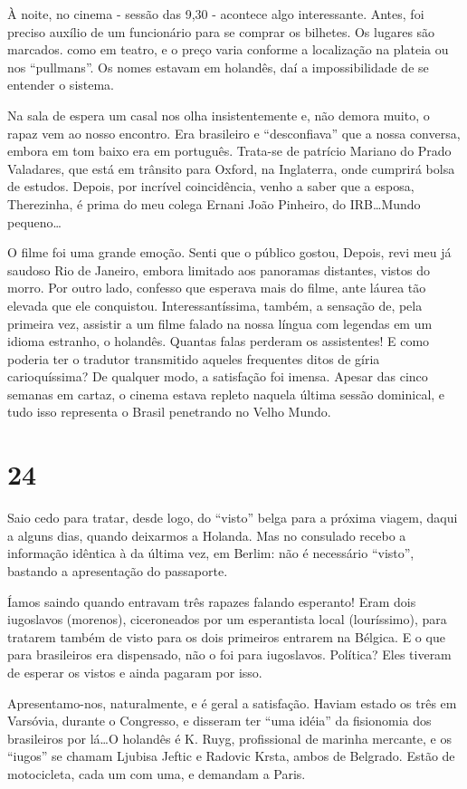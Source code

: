 À noite, no cinema - sessão das 9,30 - acontece algo interessante. Antes, foi preciso auxílio de um funcionário para se comprar os bilhetes. Os lugares são marcados. como em teatro, e o preço varia conforme a localização na plateia ou nos “pullmans”. Os nomes estavam em holandês, daí a impossibilidade de se entender o sistema.

Na sala de espera um casal nos olha insistentemente e, não demora muito, o rapaz vem ao nosso encontro. Era brasileiro e “desconfiava” que a nossa conversa, embora em tom baixo era em português. Trata-se de patrício Mariano do Prado Valadares, que está em trânsito para Oxford, na Inglaterra, onde cumprirá bolsa de estudos. Depois, por incrível coincidência, venho a saber que a esposa, Therezinha, é prima do meu colega Ernani João Pinheiro, do IRB\ldots Mundo pequeno\ldots

O filme foi uma grande emoção. Senti que o público gostou, Depois, revi meu já saudoso Rio de Janeiro, embora limitado aos panoramas distantes, vistos do morro. Por outro lado, confesso que esperava mais do filme, ante láurea tão elevada que ele conquistou. Interessantíssima, também, a sensação de, pela primeira vez, assistir a um filme falado na nossa língua com legendas em um idioma estranho, o holandês. Quantas falas perderam os assistentes! E como poderia ter o tradutor transmitido aqueles frequentes ditos de gíria carioquíssima? De qualquer modo, a satisfação foi imensa. Apesar das cinco semanas em cartaz, o cinema estava repleto naquela última sessão dominical, e tudo isso representa o Brasil penetrando no Velho Mundo.

\section*{24 \adfflatleafright {}}
Saio cedo para tratar, desde logo, do “visto” belga para a próxima viagem, daqui a alguns dias, quando deixarmos a Holanda. Mas no consulado recebo a informação idêntica à da última vez, em Berlim: não é necessário “visto”, bastando a apresentação do passaporte.

Íamos saindo quando entravam três rapazes falando esperanto! Eram dois iugoslavos (morenos), ciceroneados por um esperantista local (louríssimo), para tratarem também de visto para os dois primeiros entrarem na Bélgica. E o que para brasileiros era dispensado, não o foi para iugoslavos. Política? Eles tiveram de esperar os vistos e ainda pagaram por isso.

Apresentamo-nos, naturalmente, e é geral a satisfação. Haviam estado os três em Varsóvia, durante o Congresso, e disseram ter “uma idéia” da fisionomia dos brasileiros por lá\ldots O holandês é K. Ruyg, profissional de marinha mercante, e os “iugos” se chamam Ljubisa Jeftic e Radovic Krsta, ambos de Belgrado. Estão de motocicleta, cada um com uma, e demandam a Paris.

